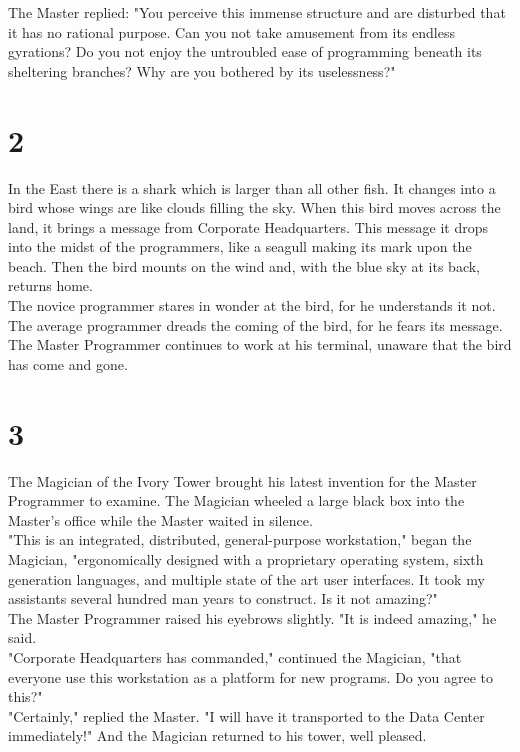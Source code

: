 \documentclass[14pt, letterpaper]{book}
\begin{document}
The Master replied: "You perceive this immense structure and are disturbed that it has no rational purpose. Can you not take amusement from its endless gyrations? Do you not enjoy the untroubled ease of programming beneath its sheltering branches? Why are you bothered by its uselessness?"

\section*{2}
In the East there is a shark which is larger than all other fish. It changes into a bird whose wings are like clouds filling the sky. When this bird moves across the land, it brings a message from Corporate Headquarters. This message it drops into the midst of the programmers, like a seagull making its mark upon the beach. Then the bird mounts on the wind and, with the blue sky at its back, returns home.\\

The novice programmer stares in wonder at the bird, for he understands it not. The average programmer dreads the coming of the bird, for he fears its message. The Master Programmer continues to work at his terminal, unaware that the bird has come and gone.

\section*{3}
The Magician of the Ivory Tower brought his latest invention for the Master Programmer to examine. The Magician wheeled a large black box into the Master's office while the Master waited in silence.\\

"This is an integrated, distributed, general-purpose workstation," began the Magician, "ergonomically designed with a proprietary operating system, sixth generation languages, and multiple state of the art user interfaces. It took my assistants several hundred man years to construct. Is it not amazing?"\\

The Master Programmer raised his eyebrows slightly. "It is indeed amazing," he said.\\

"Corporate Headquarters has commanded," continued the Magician, "that everyone use this workstation as a platform for new programs. Do you agree to this?"\\

"Certainly," replied the Master. "I will have it transported to the Data Center immediately!" And the Magician returned to his tower, well pleased.\\
\end{document}
